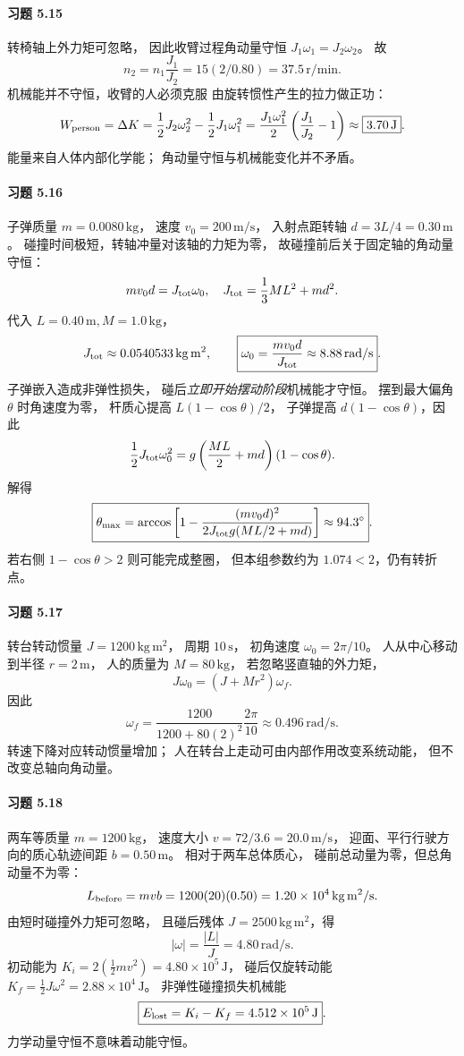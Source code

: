\paragraph{习题 5.15}
转椅轴上外力矩可忽略，
因此收臂过程角动量守恒
\(J_1\omega_1=J_2\omega_2\)。
故
\[
 \boxed{n_2=n_1\frac{J_1}{J_2}
 =15(2/0.80)=37.5\,\mathrm{r/min}}.
\]
机械能并不守恒，收臂的人必须克服
由旋转惯性产生的拉力做正功：
\[
 W_{\rm person}=\Delta K
 =\frac12J_2\omega_2^2-\frac12J_1\omega_1^2
 =\frac{J_1\omega_1^2}{2}
 \left(\frac{J_1}{J_2}-1\right)
 \approx\boxed{3.70\,\mathrm J}.
\]
能量来自人体内部化学能；
角动量守恒与机械能变化并不矛盾。


\paragraph{习题 5.16}
子弹质量 \(m=0.0080\,\mathrm{kg}\)，
速度 \(v_0=200\,\mathrm{m/s}\)，
入射点距转轴 \(d=3L/4=0.30\,\mathrm m\)。
碰撞时间极短，转轴冲量对该轴的力矩为零，
故碰撞前后关于固定轴的角动量守恒：
\[
 mv_0d=J_{\rm tot}\omega_0,\quad
 J_{\rm tot}=\frac13ML^2+md^2.
\]
代入 \(L=0.40\,\mathrm m,M=1.0\,\mathrm{kg}\)，
\[
 J_{\rm tot}\approx0.0540533\,\mathrm{kg\,m^2},
 \qquad
 \boxed{\omega_0=\frac{mv_0d}{J_{\rm tot}}
 \approx8.88\,\mathrm{rad/s}}.
\]
子弹嵌入造成非弹性损失，
碰后\emph{立即开始摆动阶段}机械能才守恒。
摆到最大偏角 \(\theta\) 时角速度为零，
杆质心提高 \(L(1-\cos\theta)/2\)，
子弹提高 \(d(1-\cos\theta)\)，因此
\[
 \frac12J_{\rm tot}\omega_0^2
 =g\left(\frac{ML}{2}+md\right)(1-\cos\theta).
\]
解得
\[
 \boxed{\theta_{\max}=
 \arccos\left[1-
 \frac{(mv_0d)^2}{
 2J_{\rm tot}g(ML/2+md)}\right]
 \approx94.3^\circ}.
\]
若右侧 \(1-\cos\theta>2\) 则可能完成整圈，
但本组参数约为 \(1.074<2\)，仍有转折点。

\paragraph{习题 5.17}
转台转动惯量 \(J=1200\,\mathrm{kg\,m^2}\)，
周期 \(10\,\mathrm s\)，
初角速度 \(\omega_0=2\pi/10\)。
人从中心移动到半径 \(r=2\,\mathrm m\)，
人的质量为 \(M=80\,\mathrm{kg}\)，
若忽略竖直轴的外力矩，
\[
 J\omega_0=(J+Mr^2)\omega_f.
\]
因此
\[
 \boxed{\omega_f=
 \frac{1200}{1200+80(2)^2}\frac{2\pi}{10}
 \approx0.496\,\mathrm{rad/s}}.
\]
转速下降对应转动惯量增加；
人在转台上走动可由内部作用改变系统动能，
但不改变总轴向角动量。

\paragraph{习题 5.18}
两车等质量 \(m=1200\,\mathrm{kg}\)，
速度大小 \(v=72/3.6=20.0\,\mathrm{m/s}\)，
迎面、平行行驶方向的质心轨迹间距
\(b=0.50\,\mathrm m\)。
相对于两车总体质心，
碰前总动量为零，但总角动量不为零：
\[
 L_{\rm before}=mvb
 =1200(20)(0.50)=1.20\times10^4\,\mathrm{kg\,m^2/s}.
\]
由短时碰撞外力矩可忽略，
且碰后残体 \(J=2500\,\mathrm{kg\,m^2}\)，得
\[
 \boxed{|\omega|=\frac{|L|}{J}=4.80\,\mathrm{rad/s}}.
\]
初动能为
\(K_i=2(\tfrac12mv^2)=4.80\times10^5\,\mathrm J\)，
碰后仅旋转动能
\(K_f=\tfrac12J\omega^2
 =2.88\times10^4\,\mathrm J\)。
非弹性碰撞损失机械能
\[
 \boxed{E_{\rm lost}=K_i-K_f
 =4.512\times10^5\,\mathrm J}.
\]
力学动量守恒不意味着动能守恒。

